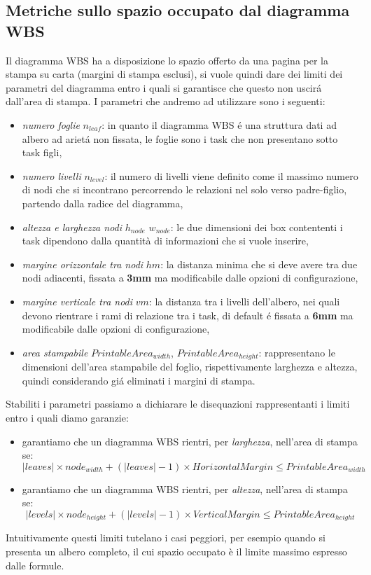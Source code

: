 \subsection{Metriche sullo spazio occupato dal diagramma WBS}
Il diagramma WBS ha a disposizione lo spazio offerto da una pagina per la
stampa su carta (margini di stampa esclusi), si vuole quindi dare dei limiti dei parametri del diagramma entro i quali si garantisce che questo non uscir\'a dall'area di stampa. I parametri che andremo ad utilizzare sono i seguenti:
\begin{itemize}
	\item \emph{numero foglie} $n_{leaf}$: in quanto il diagramma WBS \'e una
	struttura dati ad albero ad ariet\'a non fissata, le foglie sono i task che non
	presentano sotto task figli,
	\item \emph{numero livelli} $n_{level}$: il numero di livelli viene definito come il massimo numero di nodi che si incontrano percorrendo le relazioni nel solo verso padre-figlio, partendo dalla radice del diagramma,
	\item \emph{altezza e larghezza nodi} $h_{node}$ $w_{node}$: le due dimensioni dei box contententi i task dipendono dalla quantità di informazioni che si vuole inserire,
	\item \emph{margine orizzontale tra nodi} $hm$: la distanza minima che si deve avere tra due nodi adiacenti, fissata a \textbf{3mm} ma modificabile dalle opzioni di configurazione,
	\item \emph{margine verticale tra nodi} $vm$: la distanza tra i livelli
	dell'albero, nei quali devono rientrare i rami di relazione tra i task, di default \'e fissata a \textbf{6mm} ma modificabile dalle opzioni di configurazione,
	\item \emph{area stampabile} $PrintableArea_{width}$,
	$PrintableArea_{height}$: rappresentano le dimensioni dell'area stampabile del foglio, rispettivamente larghezza e altezza, quindi considerando gi\'a eliminati i margini di stampa.
\end{itemize}

Stabiliti i parametri passiamo a dichiarare le disequazioni rappresentanti i limiti entro i quali diamo garanzie:
\begin{itemize}
	\item garantiamo che un diagramma WBS rientri, per \emph{larghezza}, nell'area di stampa se:
	$$ |leaves| \times node_{width} + (|leaves| - 1) \times HorizontalMargin \leq PrintableArea_{width} $$
	\item garantiamo che un diagramma WBS rientri, per \emph{altezza}, nell'area di stampa se:
	$$ |levels| \times node_{height} + (|levels| - 1) \times VerticalMargin \leq PrintableArea_{height} $$
\end{itemize}
Intuitivamente questi limiti tutelano i casi peggiori, per esempio quando si
presenta un albero completo, il cui spazio occupato \`e il limite massimo espresso dalle formule.

